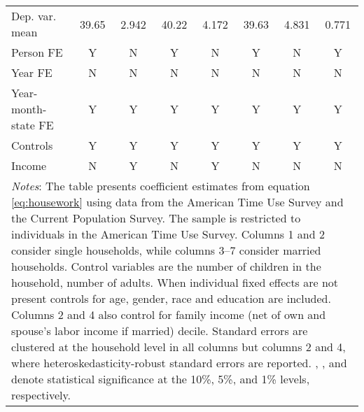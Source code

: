{\begin{tabular}{l*{7}{c}}
Dep. var. mean      &       39.65         &       2.942         &       40.22         &       4.172         &       39.63         &       4.831         &       0.771         \\
Person FE           &           Y         &           N         &           Y         &           N         &           Y         &           N         &           Y         \\
Year FE             &           N         &           N         &           N         &           N         &           N         &           N         &           N         \\
Year-month-state FE &           Y         &           Y         &           Y         &           Y         &           Y         &           Y         &           Y         \\
Controls            &           Y         &           Y         &           Y         &           Y         &           Y         &           Y         &           Y         \\
Income              &           N         &           Y         &           N         &           Y         &           N         &           N         &           N         \\
\bottomrule
\multicolumn{8}{p{17cm}}{\footnotesize \textit{Notes}: The table presents coefficient estimates from equation \ref{eq:housework} using data from the American Time Use Survey and the Current Population Survey. The sample is restricted to individuals in the American Time Use Survey. Columns 1 and 2 consider single households, while columns 3--7 consider married households. Control variables are the number of children in the household, number of adults. When individual fixed effects are not present controls for age, gender, race and education are included. Columns 2 and 4 also control for family income (net of own and spouse's labor income if married) decile. Standard errors are clustered at the household level in all columns but columns 2 and 4, where heteroskedasticity-robust standard errors are reported. \sym{*}, \sym{**}, and \sym{***} denote statistical significance at the 10\%, 5\%, and 1\% levels, respectively.}\\
\end{tabular}
}
